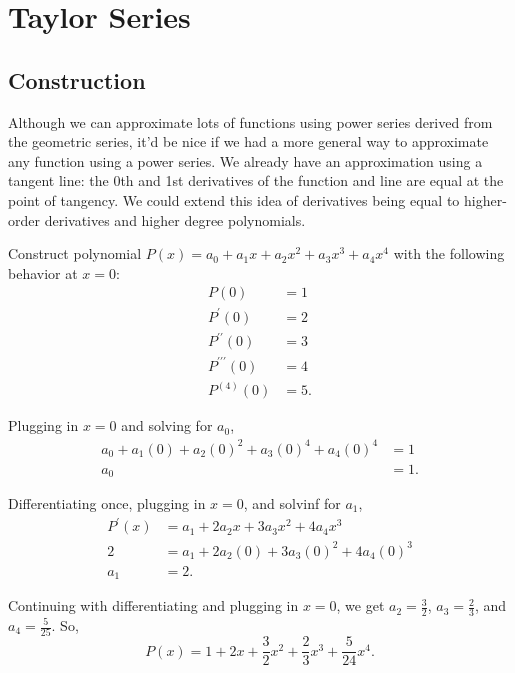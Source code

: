\section{Taylor Series}
\subsection{Construction}
Although we can approximate lots of functions using power series derived from the geometric series, it'd be nice if we had a more general way to approximate any function using a power series.
We already have an approximation using a tangent line: the 0th and 1st derivatives of the function and line are equal at the point of tangency.
We could extend this idea of derivatives being equal to higher-order derivatives and higher degree polynomials.

\begin{example}
	Construct  polynomial $P(x)=a_0+a_1x + a_2x^2 + a_3x^3 + a_4x^4$ with the following behavior at $x=0$:
	\begin{align*}
		P(0) &= 1 \\
		P^\prime(0) &= 2 \\
		P^{\prime\prime}(0) &= 3 \\
		P^{\prime\prime\prime}(0) &= 4 \\
		P^{(4)}(0) &= 5.
	\end{align*}
\end{example}
\begin{answer}
	Plugging in $x=0$ and solving for $a_0$,
	\begin{align*}
		a_0 + a_1(0) + a_2(0)^2 + a_3(0)^4 + a_4(0)^4 &= 1 \\
		a_0 &= 1. 
	\end{align*}
	
	Differentiating once, plugging in $x=0$, and solvinf for $a_1$,
	\begin{align*}
		P^\prime(x) &= a_1 + 2a_2x + 3a_3x^2 + 4a_4x^3 \\
		2 &= a_1 + 2a_2(0) + 3a_3(0)^2 + 4a_4(0)^3 \\
		a_1 &= 2.
	\end{align*}
	
	Continuing with differentiating and plugging in $x=0$, we get $a_2 = \frac{3}{2}$, $a_3 = \frac{2}{3}$, and $a_4 = \frac{5}{25}$.
	So,
	\begin{equation*}
		P(x) = 1 + 2x + \frac{3}{2}x^2 + \frac{2}{3}x^3 + \frac{5}{24}x^4.
	\end{equation*}
\end{answer}

